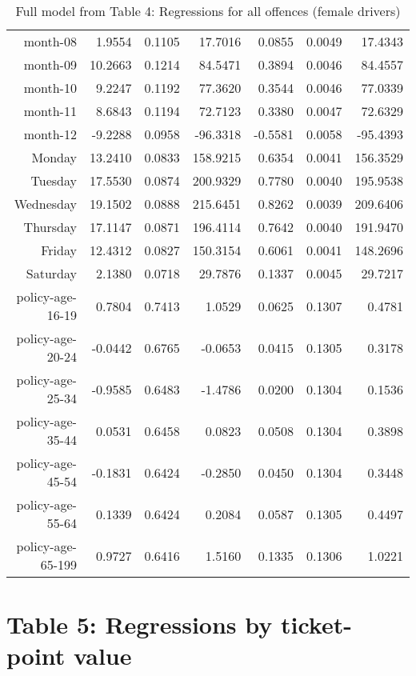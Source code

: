 \documentclass[10pt]{article}
\begin{document}
\begin{table}[ht]
\begin{tabular}{rrrrrrr}
  month-08 & 1.9554 & 0.1105 & 17.7016 & 0.0855 & 0.0049 & 17.4343 \\ 
  month-09 & 10.2663 & 0.1214 & 84.5471 & 0.3894 & 0.0046 & 84.4557 \\ 
  month-10 & 9.2247 & 0.1192 & 77.3620 & 0.3544 & 0.0046 & 77.0339 \\ 
  month-11 & 8.6843 & 0.1194 & 72.7123 & 0.3380 & 0.0047 & 72.6329 \\ 
  month-12 & -9.2288 & 0.0958 & -96.3318 & -0.5581 & 0.0058 & -95.4393 \\ 
  Monday & 13.2410 & 0.0833 & 158.9215 & 0.6354 & 0.0041 & 156.3529 \\ 
  Tuesday & 17.5530 & 0.0874 & 200.9329 & 0.7780 & 0.0040 & 195.9538 \\ 
  Wednesday & 19.1502 & 0.0888 & 215.6451 & 0.8262 & 0.0039 & 209.6406 \\ 
  Thursday & 17.1147 & 0.0871 & 196.4114 & 0.7642 & 0.0040 & 191.9470 \\ 
  Friday & 12.4312 & 0.0827 & 150.3154 & 0.6061 & 0.0041 & 148.2696 \\ 
  Saturday & 2.1380 & 0.0718 & 29.7876 & 0.1337 & 0.0045 & 29.7217 \\ 
  policy-age-16-19 & 0.7804 & 0.7413 & 1.0529 & 0.0625 & 0.1307 & 0.4781 \\ 
  policy-age-20-24 & -0.0442 & 0.6765 & -0.0653 & 0.0415 & 0.1305 & 0.3178 \\ 
  policy-age-25-34 & -0.9585 & 0.6483 & -1.4786 & 0.0200 & 0.1304 & 0.1536 \\ 
  policy-age-35-44 & 0.0531 & 0.6458 & 0.0823 & 0.0508 & 0.1304 & 0.3898 \\ 
  policy-age-45-54 & -0.1831 & 0.6424 & -0.2850 & 0.0450 & 0.1304 & 0.3448 \\ 
  policy-age-55-64 & 0.1339 & 0.6424 & 0.2084 & 0.0587 & 0.1305 & 0.4497 \\ 
  policy-age-65-199 & 0.9727 & 0.6416 & 1.5160 & 0.1335 & 0.1306 & 1.0221 \\ 
   \hline
\end{tabular}
\caption{Full model from Table 4: Regressions for all offences (female drivers)} 
\label{tab_4_all_pts_F}
\end{table}


\clearpage
\pagebreak




\section*{Table 5: Regressions by ticket-point value}
\end{document}
